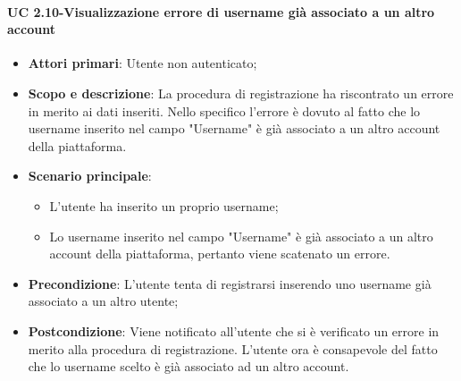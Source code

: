             \paragraph{UC 2.10-Visualizzazione errore di username già associato a un altro account}
            \begin{itemize}
                \item \textbf{Attori primari}: Utente non autenticato;
                \item \textbf{Scopo e descrizione}: La procedura di registrazione ha riscontrato un errore in merito ai
                dati inseriti. Nello specifico l'errore è dovuto al fatto che lo username inserito nel campo "Username" è già associato a un altro account della piattaforma.
                \item \textbf{Scenario principale}: 
                    \begin{itemize}
                        \item L'utente ha inserito un proprio username;
                        \item Lo username inserito nel campo "Username" è già associato a un altro account della piattaforma, pertanto viene scatenato un errore.
                    \end{itemize}
                \item \textbf{Precondizione}:  L'utente tenta di registrarsi inserendo uno username già associato a un altro utente;
                 \item \textbf{Postcondizione}: Viene notificato all'utente che si è verificato un errore in merito
                alla procedura di registrazione. L'utente ora è consapevole del fatto che lo username scelto è già associato ad un altro account.
            \end{itemize}
        
        
        
        
